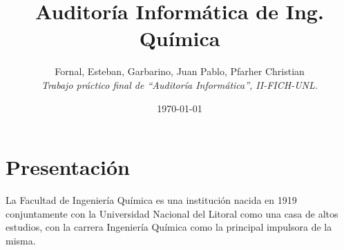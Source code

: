 \documentclass[10pt,a4paper,final]{article}
\begin{document}
\title{Auditoría Informática de Ing. Química}
\author{Fornal, Esteban, Garbarino, Juan Pablo, Pfarher Christian\\
\textit{Trabajo práctico final de ``Auditoría Informática'', II-FICH-UNL.}}
\date{\today}
\maketitle
\newpage
\tableofcontents
\newpage
\section{Presentación}
La Facultad de Ingeniería Química es una institución nacida en 1919 conjuntamente con la Universidad Nacional del Litoral como una casa de altos estudios, con la carrera Ingeniería Química como la principal impulsora de la misma.

\end{document}
